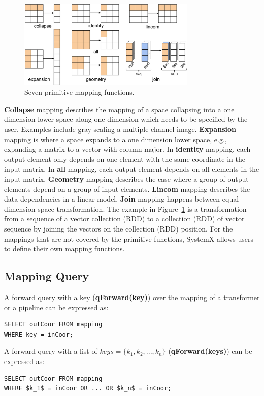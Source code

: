 \documentclass{sig-alternate}
\begin{document}
\begin{figure}[t]
\begin{center}
    \includegraphics[width=85mm]{pictures/narrowmapping}
\caption {Seven primitive mapping functions.
    \label{fig:narrowmapping}
}
\end{center}
\end{figure}

{\bf Collapse} mapping describes the mapping of a space collapsing into a one dimension lower space along one dimension which needs
to be specified by the user. Examples include gray scaling a multiple channel image.
{\bf Expansion} mapping is where a space expands to a one dimension lower space, e.g., expanding a matrix to a vector with column major.
In {\bf identity} mapping, each output element only depends on one element with the same coordinate in the input matrix.
In {\bf all} mapping, each output element depends on all elements in the input matrix.
{\bf Geometry} mapping describes the case where a group of output elements depend on a group of input elements.
{\bf Lincom} mapping describes the data dependencies in a linear model.
{\bf Join} mapping happens between equal dimension space transformation. The example in Figure~\ref{fig:narrowmapping} 
is a transformation from a sequence of a vector collection (RDD) to a collection (RDD) of vector sequence by joining the vectors
on the collection (RDD) position.
For the mappings that are not covered by the primitive functions, SystemX allows users to define their own mapping functions.

\subsection{Mapping Query}
A forward query with a key  ({\bf qForward(key)}) over the mapping of a transformer or a pipeline can be expressed as:
\begin{lstlisting}
SELECT outCoor FROM mapping
WHERE key = inCoor;
\end{lstlisting}

A forward query with a list of $keys=\{k_1, k_2, ..., k_n\}$ ({\bf qForward(keys)}) can be expressed as:
\begin{lstlisting}
SELECT outCoor FROM mapping
WHERE $k_1$ = inCoor OR ... OR $k_n$ = inCoor;
\end{lstlisting}
\end{document}
